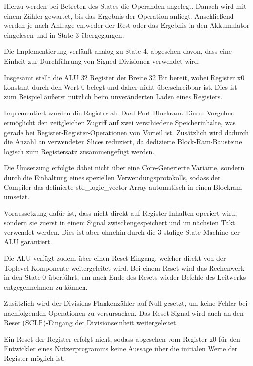 Hierzu werden bei Betreten des States die Operanden angelegt. Danach wird mit einem Z\"ahler gewartet, bis das Ergebnis der Operation anliegt.
Anschlie\ss{}end werden je nach Anfrage entweder der Rest oder das Ergebnis in den Akkumulator eingelesen und in State 3 \"ubergegangen.

Die Implementierung verl\"auft analog zu State 4, abgesehen davon, dass eine Einheit zur Durchf\"uhrung von Signed-Divisionen verwendet wird.

Insgesamt stellt die ALU 32 Register der Breite 32 Bit bereit, wobei Register x0 konstant durch den Wert 0 belegt und daher nicht \"uberschreibbar ist. Dies ist zum Beispiel \"au\ss{}erst n\"utzlich beim unver\"anderten Laden eines Registers.

Implementiert wurden die Register als Dual-Port-Blockram. Dieses Vorgehen erm\"oglicht den zeitgleichen Zugriff auf zwei verschiedene Speicherinhalte, was gerade bei Register-Register-Operationen von Vorteil ist. Zus\"atzlich wird dadurch die Anzahl an verwendeten Slices reduziert, da dedizierte Block-Ram-Bausteine logisch zum Registersatz zusammengef\"ugt werden.\vspace{10pt}

Die Umsetzung erfolgte dabei nicht \"uber eine Core-Generierte Variante, sondern durch die Einhaltung eines speziellen Verwendungsprotokolls, sodass der Compiler das definierte std\_logic\_vector-Array automatisch in einen Blockram umsetzt.

Voraussetzung daf\"ur ist, dass nicht direkt auf Register-Inhalten operiert wird, sondern sie zuerst in einem Signal zwischengespeichert und im n\"achsten Takt verwendet werden. Dies ist aber ohnehin durch die 3-stufige State-Machine der ALU garantiert.

Die ALU verf\"ugt zudem \"uber einen Reset-Eingang, welcher direkt von der Toplevel-Komponente weitergeleitet wird. Bei einem Reset wird das Rechenwerk in den State 0 \"uberf\"uhrt, um nach Ende des Resets wieder Befehle des Leitwerks entgegennehmen zu k\"onnen.

Zus\"atzlich wird der Divisions-Flankenz\"ahler auf Null gesetzt, um keine Fehler bei nachfolgenden Operationen zu versursachen. Das Reset-Signal wird auch an den Reset (SCLR)-Eingang der Divisionseinheit weitergeleitet.

Ein Reset der Register erfolgt nicht, sodass abgesehen vom Register x0 f\"ur den Entwickler eines Nutzerprogramms keine Aussage \"uber die initialen Werte der Register m\"oglich ist.

